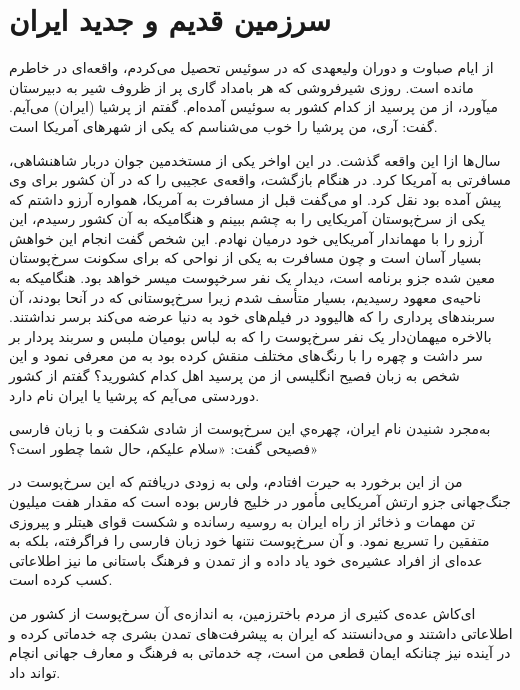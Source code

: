 \chapter{سرزمین قدیم و جدید ایران}

از ایام صباوت و دوران ولیعهدی که در سوئیس تحصیل می‌کردم، واقعه‌ای در خاطرم مانده است. روزی شیرفروشی که هر بامداد گاری پر از ظروف شیر به دبیرستان میآورد، از من پرسید از کدام کشور به سوئیس آمده‌ام. گفتم از پرشیا (ایران) می‌آیم. گفت: آری، من پرشیا را خوب می‌شناسم که یکی از شهرهای آمریکا است. 
\par
سال‌ها ازا این واقعه گذشت. در این اواخر یکی از مستخدمین جوان دربار شاهنشاهی، مسافرتی به آمریکا کرد. در هنگام بازگشت، واقعه‌ی عجیبی را که در آن کشور برای وی پیش آمده بود نقل کرد. او می‌گفت قبل از مسافرت به آمریکا، همواره آرزو  داشتم که یکی از سرخ‌پوستان آمریکایی را به چشم ببینم و هنگامیکه به آن کشور رسیدم، این آرزو را با مهماندار آمریکایی خود درمیان نهادم. این شخص گفت انجام این خواهش بسیار آسان است و چون مسافرت به یکی از نواحی که برای سکونت سرخ‌پوستان معین شده جزو برنامه است، دیدار یک‌ نفر سرخپوست میسر خواهد بود. 
هنگامیکه به ناحیه‌ی معهود رسیدیم، بسیار متأسف شدم زیرا سرخ‌پوستانی  که در آنحا بودند، آن سربندهای پرداری را که هالیوود در فیلم‌های خود به دنیا عرضه می‌کند برسر نداشتند. بالاخره میهمان‌دار یک نفر سرخ‌پوست را که به لباس بومیان ملبس و سربند پردار بر سر داشت و چهره را با رنگ‌های مختلف منقش کرده بود به من معرفی نمود و این شخص به زبان فصیح انگلیسی از من پرسید اهل کدام کشورید؟ گفتم از کشور دوردستی می‌آیم که پرشیا یا ایران نام دارد.  
\par
به‌مجرد شنیدن نام ایران، چهره‌ي این سرخ‌پوست از شادی شکفت و با زبان فارسی فصیحی گفت: «سلام علیکم، حال شما چطور است؟»
\par
من از این برخورد به حیرت افتادم، ولی به زودی دریافتم که این سرخ‌پوست در جنگ‌‌جهانی جزو ارتش آمریکایی مأمور در خلیج فارس بوده است که مقدار هفت میلیون تن مهمات و ذخائر از راه ایران به روسیه رسانده و شکست قوای هیتلر و پیروزی متفقین را تسریع نمود. و آن سرخ‌پوست نتنها خود زبان فارسی را فراگرفته، بلکه به عده‌ای از افراد عشیره‌ی خود یاد داده و از تمدن و فرهنگ باستانی ما نیز اطلاعاتی کسب کرده است.
\par 
ای‌کاش عده‌ی کثیری از مردم باخترزمین، به اندازه‌ی آن سرخ‌پوست از کشور من اطلاعاتی داشتند و می‌دانستند که ایران به پیشرفت‌های تمدن بشری چه خدماتی کرده و در آینده نیز چنانکه ایمان قطعی من است، چه خدماتی به فرهنگ و معارف جهانی انچام تواند داد. 
